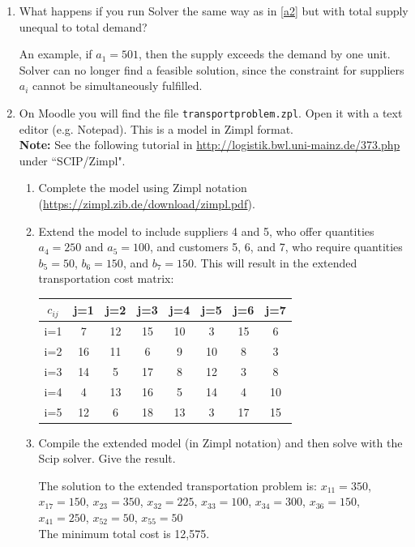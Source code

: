 \begin{enumerate}
	\item What happens if you run Solver the same way as in \ref{a2} but with total supply unequal to total demand?
	\begin{solution}
		An example, if $a_1=501$, then the supply exceeds the demand by one unit. Solver can no longer  find a feasible solution, since the constraint for suppliers $a_i$ cannot be simultaneously fulfilled.
	\end{solution}


\item On Moodle you will find the file \texttt{transportproblem.zpl}. Open it with a text editor (e.g. Notepad). This is a model in Zimpl format. \\
\textbf{Note:} See the following tutorial in \href{http://logistik.bwl.uni-mainz.de/373.php}{http://logistik.bwl.uni-mainz.de/373.php} under ``SCIP/Zimpl".
\begin{enumerate}
	\item Complete the model using Zimpl notation (\url{https://zimpl.zib.de/download/zimpl.pdf}).
	\item Extend the model to include suppliers 4 and 5, who offer quantities $a_4=250$ and $a_5=100$, and customers 5, 6, and 7, who require quantities $b_5=50$, $b_6=150$, and $b_7=150$. This will result in the extended transportation cost matrix: \\
  \begin{center}
    \begin{tabular}{c|ccccccc}
    $c_{ij}$ & j=1   & j=2   & j=3   & j=4	& j=5	& j=6	& j=7 \\
    \hline
    i=1   & 7     & 12    & 15    & 10 		& 3			& 15		& 6\\
    i=2   & 16    & 11    & 6     & 9 		& 10		& 8			& 3\\
    i=3   & 14    & 5     & 17    & 8  		& 12		& 3			& 8\\
    i=4		& 4			& 13		& 16		& 5			& 14		&	4			& 10\\
    i=5		&	12		& 6			& 18		& 13		& 3			& 17		& 15\\	
    \end{tabular}
  \end{center}
	\item Compile the extended model (in Zimpl notation) and then solve with the Scip solver. Give the result.
	\begin{solution}
		The solution to the extended transportation problem is: $x_{11}=350$, $x_{17}=150$, $x_{23}=350$, $x_{32}=225$, $x_{33}=100$, $x_{34}=300$, $x_{36}=150$, $x_{41}=250$, $x_{52}=50$, $x_{55}=50$\\
		The minimum total cost is 12,575.
	\end{solution}
\end{enumerate}


\end{enumerate}
